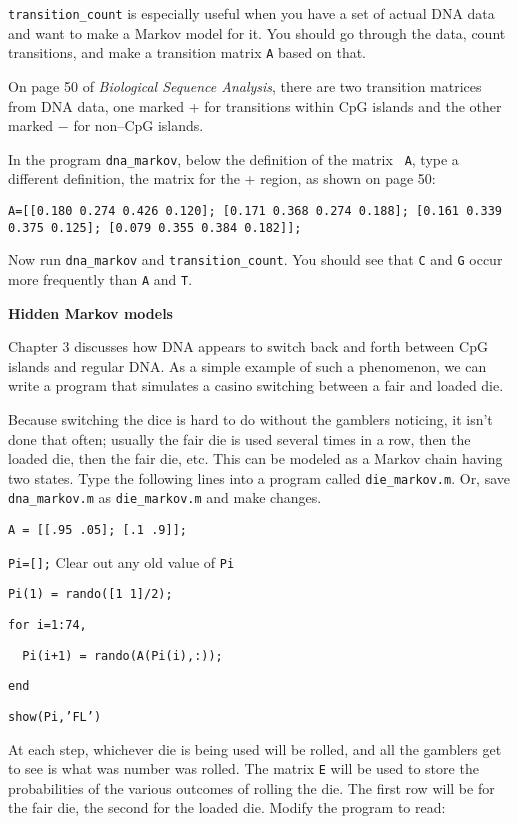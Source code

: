{\tt transition\_count} is especially useful when you have a set of actual
DNA data and want to make a Markov model for it.
You should go through the data, count transitions, and make a transition
matrix {\tt A} based on that.

On page 50 of {\em Biological Sequence Analysis}, there are two transition
matrices from DNA data, one marked + for transitions within CpG islands and
the other marked $-$ for non--CpG islands.

In the program {\tt dna\_markov}, below the definition of the matrix {\tt
A}, type a different definition, the matrix for the + region, as shown on
page 50:

\item {\tt A=[[0.180 0.274 0.426 0.120]; [0.171 0.368 0.274 0.188]; [0.161
0.339 0.375 0.125]; [0.079 0.355 0.384 0.182]];} \hfill

Now run {\tt dna\_markov} and {\tt transition\_count}.
You should see that {\tt C} and {\tt G} occur more frequently than {\tt A}
and {\tt T}.

\pagebreak

\hspace*{-0.5in}
{\bf Hidden Markov models}

Chapter 3 discusses how DNA appears to switch back and forth between CpG
islands and regular DNA.
As a simple example of such a phenomenon, we can write a program that
simulates a casino switching between a fair and loaded die.

Because switching the dice is hard to do without the gamblers noticing, it
isn't done that often; usually the fair die is used several times in a row,
then the loaded die, then the fair die, etc.
This can be modeled as a Markov chain having two states.
Type the following lines into a program called {\tt die\_markov.m}.
Or, save {\tt dna\_markov.m} as {\tt die\_markov.m} and make changes.

\item {\tt A  = [[.95 .05]; [.1 .9]];} \hfill
\item {\tt Pi=[];} \hfill Clear out any old value of {\tt Pi}
\item {\tt Pi(1) = rando([1 1]/2);} \hfill
\item {\tt for i=1:74,} \hfill
\item {\tt ~~Pi(i+1) = rando(A(Pi(i),:));} \hfill
\item {\tt end} \hfill
\item {\tt show(Pi,'FL')} \hfill

At each step, whichever die is being used will be rolled, and all the
gamblers get to see is what was number was rolled.
The matrix {\tt E} will be used to store the probabilities of the various
outcomes of rolling the die.
The first row will be for the fair die, the second for the loaded die.
Modify the program to read:

